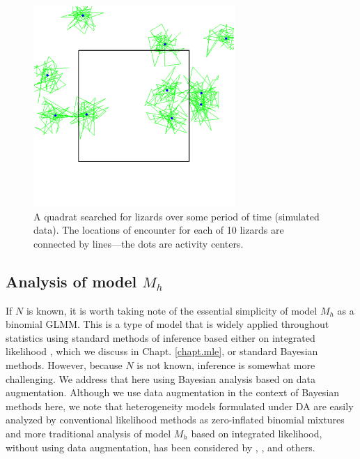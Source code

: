 \begin{figure}[ht]
\begin{center}
\includegraphics[height=3in]{Ch4-Closed/figs/quadrat}
\end{center}
\caption{A quadrat searched for lizards over some period of time
  (simulated data). The locations of encounter for each of 10 lizards are
  connected by lines---the dots are activity centers.}
\label{closed.fig.quadrat}
\end{figure}







\subsection{Analysis of model $M_h$}

If $N$ is known, it is worth taking note of the essential simplicity
of model $M_h$ as a binomial GLMM.  This is a type of model that is
widely applied throughout statistics using
standard methods of inference based either on integrated likelihood
\citep{laird_ware:1982, berger_etal:1999}, which we discuss in
Chapt. \ref{chapt.mle}, or standard Bayesian
methods. However, because $N$ is not known, inference is somewhat more
challenging. We address that here using Bayesian analysis based on
data augmentation. Although we use data augmentation in the context of
Bayesian methods here, we note that
heterogeneity models formulated under DA are easily analyzed by
conventional likelihood methods as zero-inflated binomial mixtures
\citep{royle:2006} and more traditional analysis of model $M_h$ based on
integrated likelihood, without using data augmentation, has been
considered by \citet{coull_agresti:1999}, \citet{dorazio_royle:2003},
and others.

